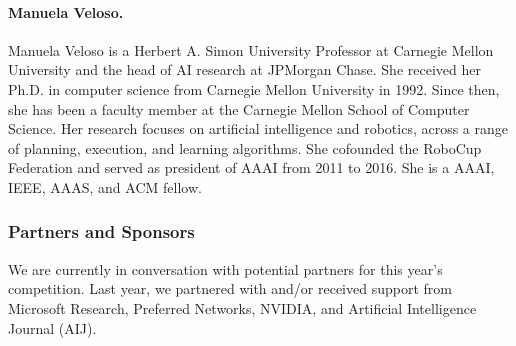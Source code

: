 \paragraph{Manuela Veloso.} Manuela Veloso is a Herbert A. Simon University Professor at Carnegie Mellon University and the head of AI research at JPMorgan Chase.
She received her Ph.D. in computer science from Carnegie Mellon University in 1992.
Since then, she has been a faculty member at the Carnegie Mellon School of Computer Science.
Her research focuses on artificial intelligence and robotics, across a range of planning, execution, and learning algorithms.
She cofounded the RoboCup Federation and served as president of AAAI from 2011 to 2016.
She is a AAAI, IEEE, AAAS, and ACM fellow.

\subsubsection{Partners and Sponsors}

We are currently in conversation with potential partners for this year's competition.
Last year, we partnered with and/or received support from Microsoft Research, Preferred Networks, NVIDIA, and Artificial Intelligence Journal (AIJ).

